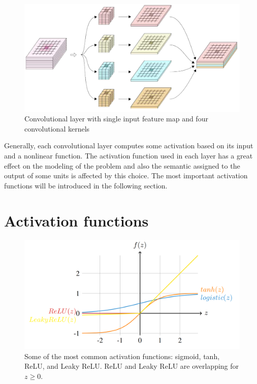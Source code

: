 \begin{figure}
    \begin{center}
        \includegraphics[width=\textwidth]{Figures/2DConvKernels.png}
        \caption{Convolutional layer with single input feature map and four convolutional kernels}
        \label{conv2Dlayer}
    \end{center}
\end{figure}


Generally, each convolutional layer computes some activation based on its input and a nonlinear function. The activation function used in each layer has a great effect on the modeling of the problem and also the semantic assigned to the output of some units is affected by this choice. The most important activation functions will be introduced in the following section.

\section{Activation functions}\label{sec:activations}
\begin{figure}
\centering
\includegraphics[width=\textwidth]{Figures/Actfuncs.png}
\caption{Some of the most common activation functions: sigmoid, tanh, ReLU, and Leaky ReLU. ReLU and Leaky ReLU are overlapping for $z \geq 0$.}
\label{fig:activations}
\end{figure}

